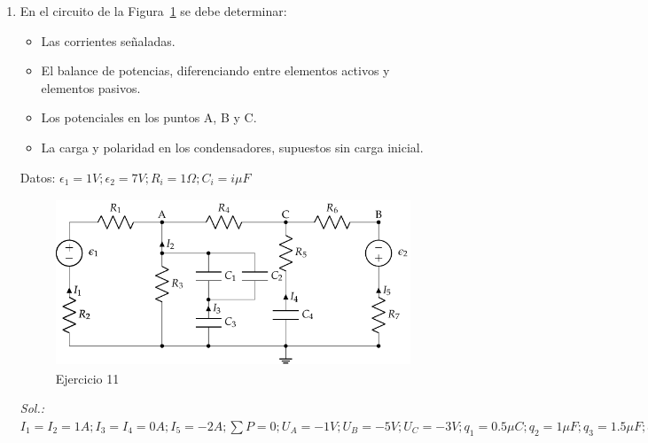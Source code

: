 \begin{enumerate}
\item En el circuito de la Figura~\ref{fig.mallas_agrupacion_condensadores} se debe determinar:
\begin{itemize}
\item Las corrientes señaladas.
\item El balance de potencias, diferenciando entre elementos activos y elementos pasivos.
\item Los potenciales en los puntos A, B y C.
\item La carga y polaridad en los condensadores, supuestos sin carga inicial.
\end{itemize}
Datos: $\epsilon_1 ={1}V; \epsilon_2 ={7}V; R_i  = {1}\Omega; C_i = {i}{\mu F}$
\begin{figure}[H]
    \centering
    \includegraphics[height=5cm]{../figs/mallas_agrupacion_condensadores.pdf}
    \caption{Ejercicio 11}
    \label{fig.mallas_agrupacion_condensadores}
\end{figure}
\emph{Sol.: $I_1=I_2=1 A; I_3=I_4=0 A; I_5=-2 A; \sum P = 0; U_A=-1 V; U_B=-5 V; U_C=-3 V; q_1=0.5 \mu C; q_2 = 1\mu F; q_3=1.5\mu F; q_4=12\mu C$}


\end{enumerate}
